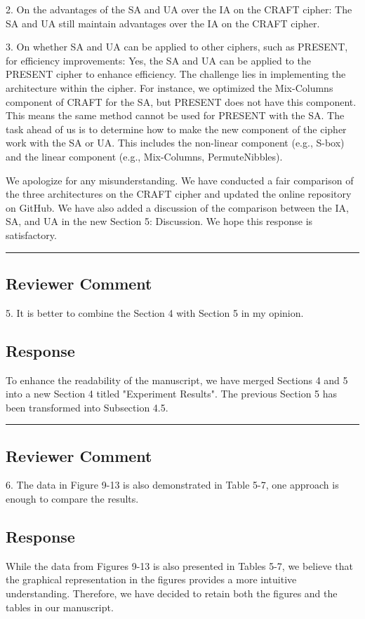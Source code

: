 2. On the advantages of the SA and UA over the IA on the CRAFT cipher: The SA and UA still maintain advantages over the IA on the CRAFT cipher.

3. On whether SA and UA can be applied to other ciphers, such as PRESENT, for efficiency improvements: Yes, the SA and UA can be applied to the PRESENT cipher to enhance efficiency. The challenge lies in implementing the architecture within the cipher. For instance, we optimized the Mix-Columns component of CRAFT for the SA, but PRESENT does not have this component. This means the same method cannot be used for PRESENT with the SA. The task ahead of us is to determine how to make the new component of the cipher work with the SA or UA. This includes the non-linear component (e.g., S-box) and the linear component (e.g., Mix-Columns, PermuteNibbles).

We apologize for any misunderstanding. We have conducted a fair comparison of the three architectures on the CRAFT cipher and updated the online repository on GitHub. We have also added a discussion of the comparison between the IA, SA, and UA in the new Section 5: Discussion. We hope this response is satisfactory.


\noindent\rule{\linewidth}{2.0pt}

\subsection{Reviewer Comment}
5. It is better to combine the Section 4 with Section 5 in my opinion.

\subsection{Response}

To enhance the readability of the manuscript, we have merged Sections 4 and 5 into a new Section 4 titled "Experiment Results". The previous Section 5 has been transformed into Subsection 4.5.

\noindent\rule{\linewidth}{2.0pt}

\subsection{Reviewer Comment}
6. The data in Figure 9-13 is also demonstrated in Table 5-7, one approach is enough to compare the results.

\subsection{Response}

While the data from Figures 9-13 is also presented in Tables 5-7, we believe that the graphical representation in the figures provides a more intuitive understanding. Therefore, we have decided to retain both the figures and the tables in our manuscript.


